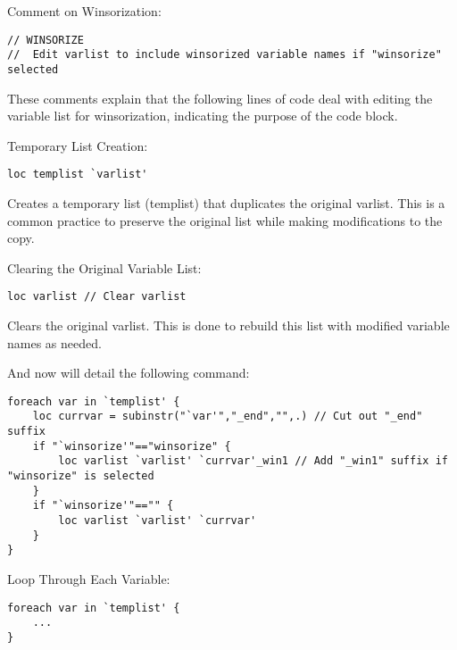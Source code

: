 \documentclass{article}
\begin{document}
Comment on Winsorization:


\begin{mdframed}
\begin{verbatim}
// WINSORIZE 
//	Edit varlist to include winsorized variable names if "winsorize" selected 
\end{verbatim}
\end{mdframed}

These comments explain that the following lines of code deal with editing the variable list for winsorization, indicating the purpose of the code block.\newline 

Temporary List Creation:

\begin{mdframed}
\begin{verbatim}
loc templist `varlist'
\end{verbatim}
\end{mdframed}

Creates a temporary list (templist) that duplicates the original varlist. This is a common practice to preserve the original list while making modifications to the copy.\newline 

Clearing the Original Variable List:
\begin{mdframed}
\begin{verbatim}
loc varlist // Clear varlist
\end{verbatim}
\end{mdframed}


Clears the original varlist. This is done to rebuild this list with modified variable names as needed.\newline 

And now will detail the following command: 
\begin{mdframed}
\begin{verbatim}
foreach var in `templist' {
	loc currvar = subinstr("`var'","_end","",.) // Cut out "_end" suffix 
	if "`winsorize'"=="winsorize" {
		loc varlist `varlist' `currvar'_win1 // Add "_win1" suffix if "winsorize" is selected
	}
	if "`winsorize'"=="" {
		loc varlist `varlist' `currvar'
	}
}
\end{verbatim}
\end{mdframed}

Loop Through Each Variable:
\begin{mdframed}
\begin{verbatim}
foreach var in `templist' {
    ...
}
\end{verbatim}
\end{mdframed}
\end{document}
